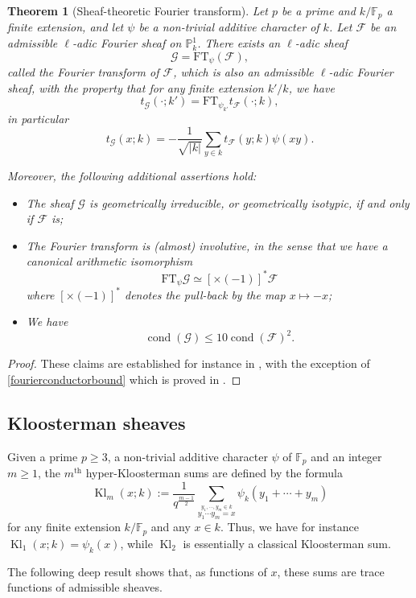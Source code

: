 \documentclass[12pt,a4paper,reqno]{amsart}
\numberwithin{equation}{section}
\DeclareMathOperator*\cond{cond}
\newcommand{\FT}{\mathrm{FT}}
\DeclareMathOperator{\hypk}{Kl}
\theoremstyle{plain}
\newtheorem{theorem}{Theorem}[section]
\theoremstyle{definition}
\newcommand\F{\mathbb{F}}
\newcommand\mcF{\mathcal{F}}
\newcommand\mcG{\mathcal{G}}
\newcommand\Pl{\mathbb{P}^1}
\newcommand\Fp{\F_{p}}
\def\stacksum#1#2{{\stackrel{{\scriptstyle #1}}
{{\scriptstyle #2}}}}
\begin{document}
\begin{theorem}[Sheaf-theoretic Fourier
  transform]\label{fourier-sheaf}
  Let $p$ be a prime and $k/\Fp$ a finite extension, and let
  $\psi$ be a non-trivial additive character of $k$.  Let $\mcF$ be an
  admissible $\ell$-adic Fou\-rier sheaf on $\Pl_k$. There exists an
  $\ell$-adic sheaf
$$
\mcG=\FT_\psi(\mcF),
$$
called the \emph{Fourier transform of $\mcF$}, which is also an
admissible $\ell$-adic Fourier sheaf, with the property that for any
finite extension $k'/k$, we have
$$
t_\mcG(\cdot;k')=\FT_{\psi_{k'}} t_\mcF(\cdot;k),
$$
in particular
$$
t_{\mcG}(x;k)=-\frac{1}{\sqrt{|k|}}
\sum_{y\in k}t_{\mcF}(y;k)\psi(xy).
$$
\par
Moreover, the following additional assertions hold:
\begin{itemize}
\item The sheaf $\mcG$ is geometrically irreducible, or geometrically
  isotypic, if and only if $\mcF$ is;
\item The Fourier transform is (almost) involutive, in the sense that
  we have a canonical arithmetic isomorphism
\begin{equation}\label{eq-fourier-inv}
\FT_\psi\mcG\simeq [\times (-1)]^*\mcF
\end{equation}
where $[\times (-1)]^*$ denotes the pull-back by the map $x\mapsto
-x$;
\item We have
\begin{equation}
 \cond(\mcG)\leq 10\cond(\mcF)^2.\label{fourierconductorbound}
\end{equation}
\end{itemize}
\end{theorem}

\begin{proof}  
  These claims are established for instance in \cite[Chap. 8]{GKM},
  with the exception of \eqref{fourierconductorbound} which is proved
  in \cite[Prop. 8.2(1)]{FKM1}.
\end{proof}

\subsection{Kloosterman sheaves}

Given a prime $p\geq 3$, a non-trivial additive character $\psi$ of $\Fp$ and
an integer $m\geq 1$, the $m^{\operatorname{th}}$ hyper-Kloosterman sums are defined by
the formula
\begin{equation}\label{klm-def}
  \hypk_m(x;k):=\frac{1}{q^{\frac{m-1}2}}\sum_\stacksum{y_1,\cdots,y_m\in
    k}{y_1\cdots y_m=x}\psi_{k}(y_1+\cdots+y_m)
\end{equation}
for any finite extension $k/\Fp$ and any $x \in k$. Thus, we have for
instance $\hypk_1(x;k) = \psi_k(x)$, while $\hypk_2$ is essentially a classical Kloosterman sum.
\par
The following deep result shows that, as functions of $x$, these sums
are trace functions of admissible sheaves.
\end{document}
